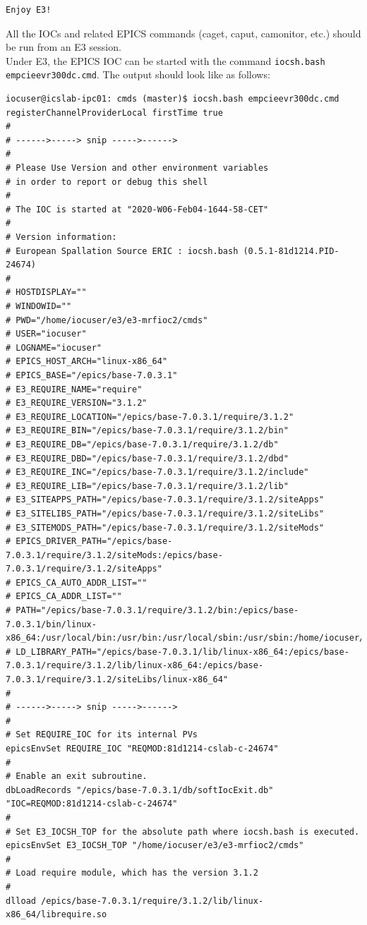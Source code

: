 \documentclass[11pt
  , a4paper
  , article
  , oneside
  , showtrims
]{memoir}
\begin{document}
{\begin{lstlisting}[style=termstyle]
Enjoy E3!
\end{lstlisting}
All the IOCs and related EPICS commands (caget, caput, camonitor, etc.) should be run from an E3 session.\\

Under E3, the EPICS IOC can be started with the command \texttt{iocsh.bash empcieevr300dc.cmd}. The output should look like as follows:
\begin{lstlisting}[style=termstyle]
iocuser@icslab-ipc01: cmds (master)$ iocsh.bash empcieevr300dc.cmd
registerChannelProviderLocal firstTime true
#
# ------>-----> snip ----->------>
#
# Please Use Version and other environment variables
# in order to report or debug this shell
#
# The IOC is started at "2020-W06-Feb04-1644-58-CET"
#
# Version information:
# European Spallation Source ERIC : iocsh.bash (0.5.1-81d1214.PID-24674)
#
# HOSTDISPLAY=""
# WINDOWID=""
# PWD="/home/iocuser/e3/e3-mrfioc2/cmds"
# USER="iocuser"
# LOGNAME="iocuser"
# EPICS_HOST_ARCH="linux-x86_64"
# EPICS_BASE="/epics/base-7.0.3.1"
# E3_REQUIRE_NAME="require"
# E3_REQUIRE_VERSION="3.1.2"
# E3_REQUIRE_LOCATION="/epics/base-7.0.3.1/require/3.1.2"
# E3_REQUIRE_BIN="/epics/base-7.0.3.1/require/3.1.2/bin"
# E3_REQUIRE_DB="/epics/base-7.0.3.1/require/3.1.2/db"
# E3_REQUIRE_DBD="/epics/base-7.0.3.1/require/3.1.2/dbd"
# E3_REQUIRE_INC="/epics/base-7.0.3.1/require/3.1.2/include"
# E3_REQUIRE_LIB="/epics/base-7.0.3.1/require/3.1.2/lib"
# E3_SITEAPPS_PATH="/epics/base-7.0.3.1/require/3.1.2/siteApps"
# E3_SITELIBS_PATH="/epics/base-7.0.3.1/require/3.1.2/siteLibs"
# E3_SITEMODS_PATH="/epics/base-7.0.3.1/require/3.1.2/siteMods"
# EPICS_DRIVER_PATH="/epics/base-7.0.3.1/require/3.1.2/siteMods:/epics/base-7.0.3.1/require/3.1.2/siteApps"
# EPICS_CA_AUTO_ADDR_LIST=""
# EPICS_CA_ADDR_LIST=""
# PATH="/epics/base-7.0.3.1/require/3.1.2/bin:/epics/base-7.0.3.1/bin/linux-x86_64:/usr/local/bin:/usr/bin:/usr/local/sbin:/usr/sbin:/home/iocuser/.local/bin:/home/iocuser/bin"
# LD_LIBRARY_PATH="/epics/base-7.0.3.1/lib/linux-x86_64:/epics/base-7.0.3.1/require/3.1.2/lib/linux-x86_64:/epics/base-7.0.3.1/require/3.1.2/siteLibs/linux-x86_64"
#
# ------>-----> snip ----->------>
#
# Set REQUIRE_IOC for its internal PVs
epicsEnvSet REQUIRE_IOC "REQMOD:81d1214-cslab-c-24674"
#
# Enable an exit subroutine.
dbLoadRecords "/epics/base-7.0.3.1/db/softIocExit.db" "IOC=REQMOD:81d1214-cslab-c-24674"
#
# Set E3_IOCSH_TOP for the absolute path where iocsh.bash is executed.
epicsEnvSet E3_IOCSH_TOP "/home/iocuser/e3/e3-mrfioc2/cmds"
#
# Load require module, which has the version 3.1.2
#
dlload /epics/base-7.0.3.1/require/3.1.2/lib/linux-x86_64/librequire.so

\end{lstlisting}}
\end{document}
